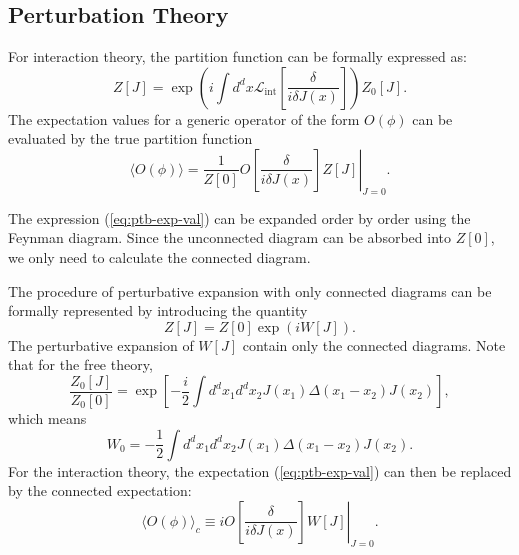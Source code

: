 \subsection{Perturbation Theory}
For interaction theory, the partition function can be formally expressed as:
\begin{equation}
	Z[J] = \exp\left(i\int d^dx \mathcal{L}_{\mathrm{int}}\left[\frac{\delta}{i\delta J(x)}\right]\right)Z_0[J].
\end{equation}
The expectation values for a generic operator of the form $O(\phi)$ can be evaluated by the true partition function
\begin{equation}
	\langle O(\phi)\rangle
	= \frac{1}{Z[0]} \left. O\left[\frac{\delta}{i\delta J(x)}\right] Z[J] \right|_{J=0}.
	\label{eq:ptb-exp-val}
\end{equation}

The expression (\ref{eq:ptb-exp-val}) can be expanded order by order using the Feynman diagram. 
Since the unconnected diagram can be absorbed into $Z[0]$, we only need to calculate the connected diagram.

The procedure of perturbative expansion with only connected diagrams can be formally represented by introducing the quantity
\begin{equation}
	Z[J] = Z[0]\exp\left(i W[J]\right).
\end{equation}
The perturbative expansion of $W[J]$ contain only the connected diagrams.
Note that for the free theory,
\begin{equation*}
	\frac{Z_0[J]}{Z_0[0]} = \exp\left[-\frac{i}{2}\int d^d x_1 d^d x_2 J(x_1) \Delta(x_1-x_2)J(x_2)\right],
\end{equation*}
which means
\begin{equation*}
	W_0 = -\frac{1}{2}\int d^d x_1 d^d x_2 J(x_1) \Delta(x_1-x_2)J(x_2).
\end{equation*}
For the interaction theory, the expectation (\ref{eq:ptb-exp-val}) can then be replaced by the connected expectation:
\begin{equation}
	\langle O(\phi)\rangle_c
	\equiv i\left. O\left[\frac{\delta}{i\delta J(x)}\right] W[J] \right|_{J=0}.
\end{equation}


